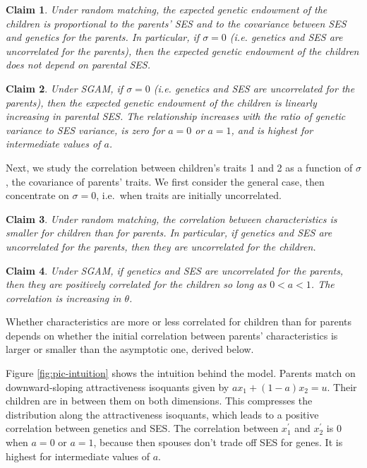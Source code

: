\documentclass[
  12pt,
]{article}
\newtheorem{claim}{Claim}
\theoremstyle{definition}
\theoremstyle{definition}
\theoremstyle{definition}
\theoremstyle{definition}
\theoremstyle{remark}
\begin{document}
\begin{claim}\label{claim-E-children-RM}
Under random matching, the expected genetic endowment of the children is
proportional to the parents' SES and to the covariance between SES and genetics
for the parents. In particular, if $\sigma = 0$ (i.e. genetics and SES are
uncorrelated for the parents), then the expected genetic endowment of the
children does not depend on parental SES.
\end{claim}

\begin{claim}\label{claim-E-children-SGAM}
Under SGAM, if $\sigma = 0$ (i.e. genetics and
SES are uncorrelated for the parents), then the expected genetic endowment of
the children is linearly increasing in parental SES. The relationship
increases with the ratio of genetic variance to SES variance, is zero for 
$a = 0$ or $a = 1$, and is highest for intermediate values of $a$.
\end{claim}

Next, we study the correlation between children's traits 1 and 2 as a function
of \(\sigma\), the covariance of parents' traits. We first consider the
general case, then concentrate on \(\sigma = 0\), i.e.~when traits are initially
uncorrelated.

\begin{claim}\label{claim-corr-children-RM}
Under random matching, the correlation between characteristics is smaller
for children than for parents. In particular, if genetics and SES are
uncorrelated for the parents, then they are uncorrelated for the children.
\end{claim}

\begin{claim}\label{claim-corr-children-SGAM}
Under SGAM, if genetics and SES are uncorrelated for the parents, then they
are positively correlated for the children so long as $0 < a < 1$. The 
correlation is increasing in $\theta$.
\end{claim}

Whether characteristics are more or less correlated for children than for
parents depends on whether the initial correlation between parents'
characteristics is larger or smaller than the asymptotic one, derived below.

Figure \ref{fig:pic-intuition} shows the intuition behind the model. Parents
match on downward-sloping attractiveness isoquants given by \(a x_1 + (1-a) x_2 = u\).
Their children are in between them on both dimensions. This compresses the
distribution along the attractiveness isoquants, which leads to a
positive correlation between genetics and SES. The correlation between \(x^\prime_1\)
and \(x^\prime_2\) is 0 when \(a = 0\) or \(a = 1\), because then spouses don't trade off
SES for genes. It is highest for intermediate values of \(a\).
\end{document}

